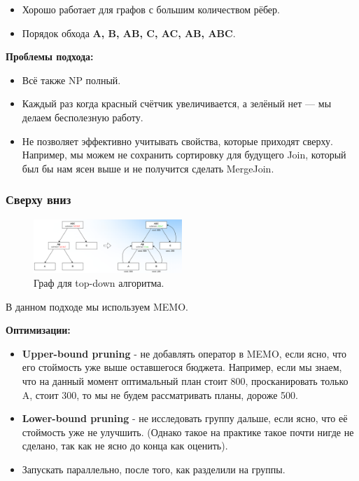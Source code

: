 \documentclass[11pt]{article}
\begin{document}
    \begin{itemize}
        \item Хорошо работает для графов с большим количеством рёбер.
        \item Порядок обхода \textbf{A, B, AB, C, AC, AB, ABC}.
    \end{itemize}

    \textbf{Проблемы подхода:}
    \begin{itemize}
        \item Всё также NP полный.
        \item Каждый раз когда красный счётчик увеличивается, а зелёный нет --- мы делаем бесполезную работу.
        \item Не позволяет эффективно учитывать свойства, которые приходят сверху.
        Например, мы можем не сохранить сортировку для будущего Join, который был бы нам ясен выше и не получится сделать MergeJoin.
    \end{itemize}

    \subsubsection{Сверху вниз}

    \begin{figure}[h!]
        \centering
        \includegraphics[width=0.5\textwidth]{Pictures/Dynamic Programming/Top down/Граф обхода}
        \caption{Граф для top-down алгоритма.}
    \end{figure}

    В данном подходе мы используем MEMO.

    \textbf{Оптимизации:}

    \begin{itemize}
        \item \textbf{Upper-bound pruning} - не добавлять оператор в MEMO, если ясно, что его стоймость уже выше оставшегося бюджета.
        Например, если мы знаем, что на данный момент оптимальный план стоит 800, просканировать только A, стоит 300, то мы не будем рассматривать планы, дороже 500.
        \item \textbf{Lower-bound pruning} - не исследовать группу дальше, если ясно, что её стоймость уже не улучшить.
        (Однако такое на практике такое почти нигде не сделано, так как не ясно до конца как оценить).
        \item Запускать параллельно, после того, как разделили на группы.
    \end{itemize}
\end{document}
